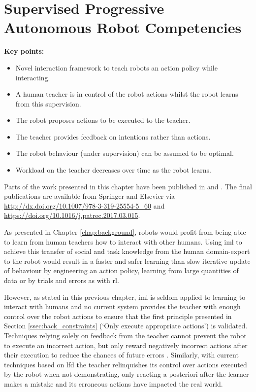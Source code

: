 \chapter{Supervised Progressive Autonomous Robot \newline Competencies}\label{chap:sparc}

\graphicspath{{images/sparc/}}

\begin{framed}
	\textbf{Key points:}
	\begin{itemize}
		\item Novel interaction framework to teach robots an action policy while interacting.
		\item A human teacher is in control of the robot actions whilst the robot learns from this supervision.
		\item The robot proposes actions to be executed to the teacher.
		\item The teacher provides feedback on intentions rather than actions.
		\item The robot behaviour (under supervision) can be assumed to be optimal.
		\item Workload on the teacher decreases over time as the robot learns.
	\end{itemize}
\end{framed}

Parts of the work presented in this chapter have been published in \cite{senft2015sparc} and \cite{senft2017supervised}. The final publications are available from Springer and Elsevier via \url{http://dx.doi.org/10.1007/978-3-319-25554-5_60} and \url{https://doi.org/10.1016/j.patrec.2017.03.015}.

\newpage

As presented in Chapter \ref{chap:background}, robots would profit from being able to learn from human teachers how to interact with other humans. Using \gls{iml} to achieve this transfer of social and task knowledge from the human domain-expert to the robot would result in a faster and safer learning than slow iterative update of behaviour by engineering an action policy, learning from large quantities of data or by trials and errors as with \gls{rl}.

However, as stated in this previous chapter, \gls{iml} is seldom applied to learning to interact with humans and no current system provides the teacher with enough control over the robot actions to ensure that the first principle presented in Section \ref{ssec:back_constraints} (`Only execute appropriate actions') is validated. Techniques relying solely on feedback from the teacher cannot prevent the robot to execute an incorrect action, but only reward negatively incorrect actions after their execution to reduce the chances of future errors \citep{senft2017supervised}. Similarly, with current techniques based on \gls{lfd} the teacher relinquishes its control over actions executed by the robot when not demonstrating, only reacting a posteriori after the learner makes a mistake and its erroneous actions have impacted the real world.

